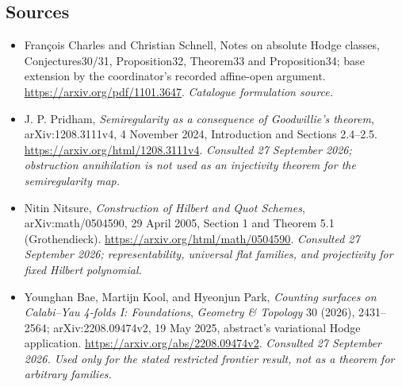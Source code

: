 \documentclass[11pt,a4paper]{article}
\numberwithin{equation}{section}
\begin{document}
\subsection{Sources}
\begin{itemize}\raggedright
\item[\textnormal{[S1]}]\hypertarget{source:30006758:1}{} François Charles and Christian Schnell, Notes on absolute Hodge classes, Conjectures30/31, Proposition32, Theorem33 and Proposition34; base extension by the coordinator's recorded affine-open argument.
\url{https://arxiv.org/pdf/1101.3647}.
{\small\textit{Catalogue formulation source.}}
\item[\textnormal{[E1]}]\hypertarget{extra:30006758:1}{} J. P. Pridham,
\emph{Semiregularity as a consequence of Goodwillie's theorem},
arXiv:1208.3111v4, 4 November 2024, Introduction and Sections 2.4--2.5.
\url{https://arxiv.org/html/1208.3111v4}.
{\small\textit{Consulted 27 September 2026; obstruction annihilation is not
used as an injectivity theorem for the semiregularity map.}}
\item[\textnormal{[E2]}]\hypertarget{extra:30006758:2}{} Nitin Nitsure,
\emph{Construction of Hilbert and Quot Schemes}, arXiv:math/0504590,
29 April 2005, Section 1 and Theorem 5.1 (Grothendieck).
\url{https://arxiv.org/html/math/0504590}.
{\small\textit{Consulted 27 September 2026; representability, universal
flat families, and projectivity for fixed Hilbert polynomial.}}
\item[\textnormal{[E3]}]\hypertarget{extra:30006758:3}{} Younghan Bae, Martijn Kool,
and Hyeonjun Park, \emph{Counting surfaces on Calabi--Yau 4-folds I:
Foundations}, \emph{Geometry \& Topology} 30 (2026), 2431--2564;
arXiv:2208.09474v2, 19 May 2025, abstract's variational Hodge application.
\url{https://arxiv.org/abs/2208.09474v2}.
{\small\textit{Consulted 27 September 2026. Used only for the stated
restricted frontier result, not as a theorem for arbitrary families.}}
\end{itemize}
\end{document}
